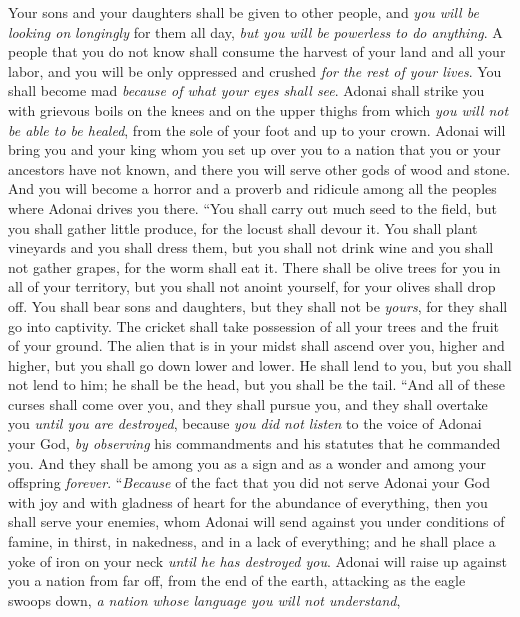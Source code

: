 \begin{biblechapter}
\verse Your sons and your daughters shall be given to other people, and \textit{you will be looking on} \textit{longingly} for them all day, \textit{but you will be powerless to do anything}.
\verse A people that you do not know shall consume the harvest of your land and all your labor, and you will be only oppressed and crushed \textit{for the rest of your lives}.
\verse You shall become mad \textit{because of what your eyes shall see}.
\verse Adonai shall strike you with grievous boils on the knees and on the upper thighs from which \textit{you will not be able to be healed}, from the sole of your foot and up to your crown.
\verse Adonai will bring you and your king whom you set up over you to a nation that you or your ancestors have not known, and there you will serve other gods of wood and stone.
\verse And you will become a horror and a proverb and ridicule among all the peoples where Adonai drives you there.
\verse “You shall carry out much seed to the field, but you shall gather little produce, for the locust shall devour it.
\verse You shall plant vineyards and you shall dress them, but you shall not drink wine and you shall not gather grapes, for the worm shall eat it.
\verse There shall be olive trees for you in all of your territory, but you shall not anoint yourself, for your olives shall drop off.
\verse You shall bear sons and daughters, but they shall not be \textit{yours}, for they shall go into captivity.
\verse The cricket shall take possession of all your trees and the fruit of your ground.
\verse The alien that is in your midst shall ascend over you, higher and higher, but you shall go down lower and lower.
\verse He shall lend to you, but you shall not lend to him; he shall be the head, but you shall be the tail.
\verse “And all of these curses shall come over you, and they shall pursue you, and they shall overtake you \textit{until you are destroyed}, because \textit{you did not listen} to the voice of Adonai your God, \textit{by observing} his commandments and his statutes that he commanded you.
\verse And they shall be among you as a sign and as a wonder and among your offspring \textit{forever}.
\verse “\textit{Because} of the fact that you did not serve Adonai your God with joy and with gladness of heart for the abundance of everything,
\verse then you shall serve your enemies, whom Adonai will send against you under conditions of famine, in thirst, in nakedness, and in a lack of everything; and he shall place a yoke of iron on your neck \textit{until he has destroyed you}.
\verse Adonai will raise up against you a nation from far off, from the end of the earth, attacking as the eagle swoops down, \textit{a nation whose language you will not understand},

\end{biblechapter}
